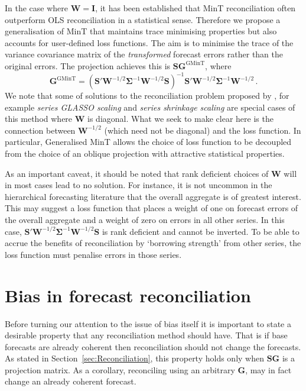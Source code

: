 \documentclass[12pt]{article}
\theoremstyle{definition}
\begin{document}
{In the case where $\bm{W}=\bm{I}$, it has been established that MinT reconciliation often outperform OLS reconciliation in a statistical sense.  Therefore we propose a generalisation of MinT that maintains trace minimising properties but also accounts for user-defined loss functions.  The aim is to minimise the trace of the variance covariance matrix of the \textit{transformed} forecast errors rather than the original errors. The projection achieves this is $\bm{S}\bm{G}^{\text{GMinT}}$, where
\begin{equation*}
\bm{G}^{\text{GMinT}}=\left(\bm{S}'{\bm W}^{-1/2}\bm{\Sigma}^{-1}{\bm W}^{-1/2}\bm{S}\right)^{-1}\bm{S}'{\bm W}^{-1/2}\bm{\Sigma}^{-1}{\bm W}^{-1/2}\,.
\end{equation*}
We note that some of solutions to the reconciliation problem proposed by \cite{NysEtAl2019}, for example \textit{series GLASSO scaling} and \textit{series shrinkage scaling} are special cases of this method where $\bm{W}$ is diagonal.  What we seek to make clear here is the connection between $\bm{W}^{-1/2}$ (which need not be diagonal) and the loss function. In particular, Generalised MinT allows the choice of loss function to be decoupled from the choice of an oblique projection with attractive statistical properties.

As an important caveat, it should be noted that rank deficient choices of $\bm{W}$ will in most cases lead to no solution.  For instance, it is not uncommon in the hierarchical forecasting literature that the overall aggregate is of greatest interest. This may suggest a loss function that places a weight of one on forecast errors of the overall aggregate and a weight of zero on errors in all other series.  In this case, $\bm{S}'{\bm W}^{-1/2}\bm{\Sigma}^{-1}{\bm W}^{-1/2}\bm{S}$ is rank deficient and cannot be inverted.  To be able to accrue the benefits of reconciliation by `borrowing strength' from other series, the loss function must penalise errors in those series.

}
\section{Bias in forecast reconciliation}\label{sec:BiasInRecon}

Before turning our attention to the issue of bias itself it is important to state a desirable property that any reconciliation method should have. That is if base forecasts are already coherent then reconciliation should not change the forecasts. As stated in Section~\ref{sec:Reconciliation}, this property holds only when $\bm{S}\bm{G}$ is a projection matrix. As a corollary, reconciling using an arbitrary $\bm{G}$, may in fact change an already coherent forecast.
\end{document}
